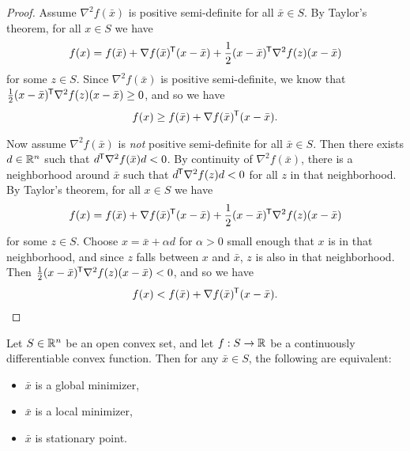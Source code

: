 \begin{proof}\proofbreak
    Assume $\nabla^2f(\bar{x})$ is positive semi-definite for all $\bar{x} \in S$. By Taylor's theorem, for all $x \in S$ we have
    \begin{align*}
        f(x) = f(\bar{x}) + \nabla f(\bar{x})^{\mkern-1.5mu\mathsf{T}}(x - \bar{x}) + \frac{1}{2}(x - \bar{x})^{\mkern-1.5mu\mathsf{T}}\nabla^2f(z)(x - \bar{x})
    \end{align*}
    for some $z \in S$. Since $\nabla^2f(\bar{x})$ is positive semi-definite, we know that $\frac{1}{2}(x - \bar{x})^{\mkern-1.5mu\mathsf{T}}\nabla^2f(z)(x - \bar{x}) \geq 0$, and so we have
    \begin{align*}
        f(x) \geq f(\bar{x}) + \nabla f(\bar{x})^{\mkern-1.5mu\mathsf{T}}(x - \bar{x}).
    \end{align*}

    Now assume $\nabla^2f(\bar{x})$ is \emph{not} positive semi-definite for all $\bar{x} \in S$. Then there exists $d \in \mathbb{R}^n$ such that $d^{\mkern-1.5mu\mathsf{T}}\nabla^2f(\bar{x})d < 0$. By continuity of $\nabla^2f(\bar{x})$, there is a neighborhood around $\bar{x}$ such that $d^{\mkern-1.5mu\mathsf{T}}\nabla^2f(z)d < 0$ for all $z$ in that neighborhood. By Taylor's theorem, for all $x \in S$ we have
    \begin{align*}
        f(x) = f(\bar{x}) + \nabla f(\bar{x})^{\mkern-1.5mu\mathsf{T}}(x - \bar{x}) + \frac{1}{2}(x - \bar{x})^{\mkern-1.5mu\mathsf{T}}\nabla^2f(z)(x - \bar{x})
    \end{align*}
    for some $z \in S$. Choose $x = \bar{x} + \alpha d$ for $\alpha > 0$ small enough that $x$ is in that neighborhood, and since $z$ falls between $x$ and $\bar{x}$, $z$ is also in that neighborhood. Then $\frac{1}{2}(x - \bar{x})^{\mkern-1.5mu\mathsf{T}}\nabla^2f(z)(x - \bar{x}) < 0$, and so we have
    \begin{align*}
        f(x) < f(\bar{x}) + \nabla f(\bar{x})^{\mkern-1.5mu\mathsf{T}}(x - \bar{x}).
    \end{align*}
\end{proof}

\begin{prop}
    Let $S \in \mathbb{R}^n$ be an open convex set, and let $f: S \to \mathbb{R}$ be a continuously differentiable convex function. Then for any $\bar{x} \in S$, the following are equivalent:
    \begin{itemize}
        \item $\bar{x}$ is a global minimizer,
        \item $\bar{x}$ is a local minimizer,
        \item $\bar{x}$ is stationary point.
    \end{itemize}
\end{prop}

